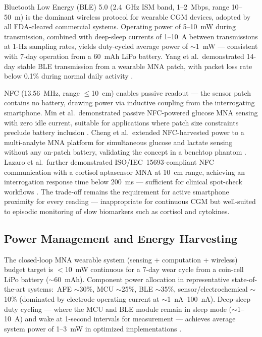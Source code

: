 \documentclass[review,1p]{elsarticle}
\begin{document}
Bluetooth Low Energy (BLE) 5.0 (2.4~GHz ISM band, 1--2~Mbps, range 10--50~m) is the dominant wireless protocol for wearable CGM devices, adopted by all FDA-cleared commercial systems. Operating power of 5--10~mW during transmission, combined with deep-sleep currents of 1--10~\textmu{}A between transmissions at 1-Hz sampling rates, yields duty-cycled average power of $\sim$1~mW — consistent with 7-day operation from a 60~mAh LiPo battery. Yang et al.\ demonstrated 14-day stable BLE transmission from a wearable MNA patch, with packet loss rate below 0.1\% during normal daily activity \cite{Yang2023CGM14day}.

NFC (13.56~MHz, range $\leq$10~cm) enables passive readout — the sensor patch contains no battery, drawing power via inductive coupling from the interrogating smartphone. Min et al.\ demonstrated passive NFC-powered glucose MNA sensing with zero idle current, suitable for applications where patch size constraints preclude battery inclusion \cite{Min2021NFC}. Cheng et al.\ extended NFC-harvested power to a multi-analyte MNA platform for simultaneous glucose and lactate sensing without any on-patch battery, validating the concept in a benchtop phantom \cite{Cheng2021NFC}. Lazaro et al.\ further demonstrated ISO/IEC~15693-compliant NFC communication with a cortisol aptasensor MNA at 10~cm range, achieving an interrogation response time below 200~ms — sufficient for clinical spot-check workflows \cite{Lazaro2023NFC}. The trade-off remains the requirement for active smartphone proximity for every reading — inappropriate for continuous CGM but well-suited to episodic monitoring of slow biomarkers such as cortisol and cytokines.

\subsection{Power Management and Energy Harvesting}
\label{subsec:power}

The closed-loop MNA wearable system (sensing + computation + wireless) budget target is $<$10~mW continuous for a 7-day wear cycle from a coin-cell LiPo battery ($\sim$60~mAh). Component power allocation in representative state-of-the-art systems:\ AFE $\sim$30\%, MCU $\sim$25\%, BLE $\sim$35\%, sensor/electrochemical $\sim$10\% (dominated by electrode operating current at $\sim$1~nA--100~nA). Deep-sleep duty cycling — where the MCU and BLE module remain in sleep mode ($\sim$1--10~\textmu{}A) and wake at 1-second intervals for measurement — achieves average system power of 1--3~mW in optimized implementations \cite{Xu2023MCU}.
\end{document}
